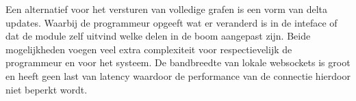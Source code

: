 Een alternatief voor het versturen van volledige grafen is een vorm van delta updates. Waarbij de programmeur opgeeft wat er veranderd is in de inteface of dat de module zelf uitvind welke delen in de boom aangepast zijn. Beide mogelijkheden voegen veel extra complexiteit voor respectievelijk de programmeur en voor het systeem. De bandbreedte van lokale websockets is groot en heeft geen last van latency waardoor de performance van de connectie hierdoor niet beperkt wordt.

